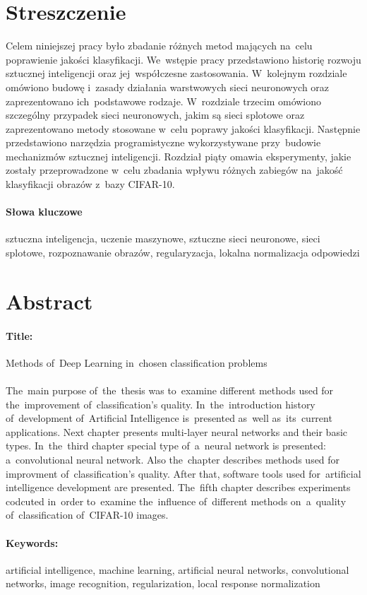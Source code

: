 \newpage
\thispagestyle{empty} %
\section*{Streszczenie}
Celem niniejszej pracy było zbadanie różnych metod mających na~celu poprawienie jakości klasyfikacji. We~wstępie
pracy przedstawiono historię rozwoju sztucznej inteligencji oraz jej~współczesne zastosowania. W~kolejnym rozdziale
omówiono budowę i~zasady działania warstwowych sieci neuronowych oraz zaprezentowano ich~podstawowe rodzaje.
W~rozdziale trzecim omówiono szczególny przypadek sieci neuronowych, jakim są sieci splotowe oraz zaprezentowano
metody stosowane w~celu poprawy jakości klasyfikacji. Następnie przedstawiono narzędzia programistyczne
wykorzystywane przy~budowie mechanizmów sztucznej inteligencji. Rozdział piąty omawia eksperymenty, jakie zostały
przeprowadzone w~celu zbadania wpływu różnych zabiegów na~jakość klasyfikacji obrazów z~bazy CIFAR-10.

\paragraph{Słowa kluczowe} sztuczna inteligencja, uczenie maszynowe, sztuczne sieci neuronowe, sieci splotowe,
rozpoznawanie obrazów, regularyzacja, lokalna normalizacja odpowiedzi

\section*{Abstract}
\paragraph{Title:} Methods of~Deep Learning in~chosen classification problems \\\\
The~main purpose of~the~thesis was to~examine different methods used for the~improvement of~classification's quality.
In~the~introduction history of~development of~Artificial Intelligence is~presented as~well as~its~current applications.
Next chapter presents multi-layer neural networks and their basic types. In~the~third chapter special type of~a~neural
network is presented: a~convolutional neural network. Also the~chapter describes methods used for improvment
of~classification's quality. After that, software tools used for~artificial intelligence development are presented.
The~fifth chapter describes experiments codcuted in~order to~examine the~influence of~different methods on~a~quality
of~classification of~CIFAR-10 images.

\paragraph{Keywords:} artificial intelligence, machine learning, artificial neural networks, convolutional networks,
image recognition, regularization, local response normalization